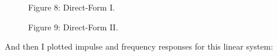 \documentclass[16pt]{report}
\begin{document}
\begin{figure}
    \begin{minipage}[h]{1\linewidth}
    \caption{Figure 8: Direct-Form I.}
    \label{fig:my_label}
    \end{minipage}
    \vfill
    \begin{minipage}[h]{1\linewidth}
    \caption{Figure 9: Direct-Form II.}
    \label{fig:my_label}
    \end{minipage}
\end{figure}
And then I plotted impulse and frequency responses for this linear system:
\end{document}
